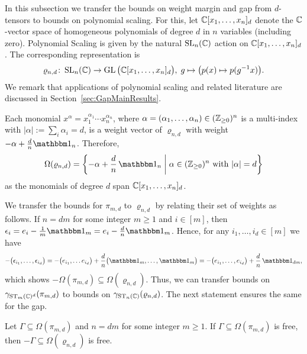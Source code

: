 In this subsection we transfer the bounds on weight margin and gap from $d$-tensors to bounds on polynomial scaling. For this, let $\mathbb C[x_1, \ldots, x_n]_d$ denote the $\mathbb C$-vector space of homogeneous polynomials of degree $d$ in $n$ variables (including zero). Polynomial Scaling is given by the natural $\operatorname{SL}_{n}(\mathbb C)$ action on $\mathbb C[x_1, \ldots, x_n]_d$. The corresponding representation is
\begin{align*}
	\varrho_{n,d} \colon \operatorname{SL}_n(\mathbb C) \to \operatorname{GL} \big( \mathbb C[x_1, \ldots, x_n]_d \big), \; g \mapsto \big( p(x) \mapsto p(g^{-1} x) \big).
\end{align*}
We remark that applications of polynomial scaling and related literature are discussed in Section~\ref{sec:GapMainResults}.

Each monomial $x^\alpha = x_1^{\alpha_1} \cdots x_n^{\alpha_n}$, where $\alpha = (\alpha_1, \ldots, \alpha_n) \in (\mathbb Z_{\geq 0})^n$ is a multi-index with $\vert \alpha \vert := \sum_i \alpha_i = d$, is a weight vector of $\varrho_{n,d}$ with weight $- \alpha + \frac{d}{n} \ones_n$. Therefore,
\begin{align*}
	\Omega(\varrho_{n,d}) = \left\lbrace - \alpha + \frac{d}{n} \, \ones_n \; \bigg\vert \; \alpha \in (\ZZ_{\geq 0})^n \text{ with } \vert \alpha \vert = d \right\rbrace 
\end{align*}
as the monomials of degree $d$ span $\mathbb C[x_1,\ldots,x_n]_d$.

We transfer the bounds for $\pi_{m,d}$ to $\varrho_{n,d}$ by relating their set of weights as follows.
If $n = dm$ for some integer $m \geq 1$ and $i \in [m]$, then $\eps_i  = e_i - \frac{1}{m} \ones_m = e_i - \frac{d}{n} \ones_m$. Hence, for any $i_1,\ldots,i_d \in [m]$ we have 
	\[ - \big( \eps_{i_1},\ldots,\eps_{i_d} \big) = - \big( e_{i_1}, \ldots e_{i_d} \big) 
	+ \frac{d}{n} \big( \ones_m, \ldots, \ones_m \big) = - \big( e_{i_1},\ldots, e_{i_d} \big) + \frac{d}{n}\, \ones_{dm}, \]
which shows $- \Omega(\pi_{m,d}) \subseteq \Omega(\varrho_{n,d})$. Thus, we can transfer bounds on $\gamma_{\operatorname{ST}_m(\mathbb C)^d}(\pi_{m,d})$ to bounds on $\gamma_{\operatorname{ST}_n(\mathbb C)}(\varrho_{n,d})$. The next statement ensures the same for the gap.

\begin{prop} \label{prop:FreeTensorVsPolynomial}
	Let $\Gamma \subseteq \Omega(\pi_{m,d})$ and $n = dm$ for some integer $m \geq 1$. If $\Gamma \subseteq \Omega(\pi_{m,d})$ is free, then $-\Gamma \subseteq \Omega(\varrho_{n,d})$ is free.
\end{prop}

